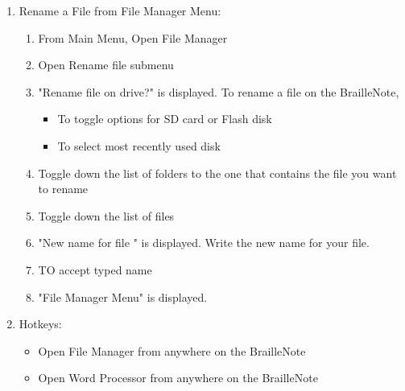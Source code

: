 \documentclass[10pt,letterpaper,twoside]{report}
\begin{document}
{\begin{enumerate}
\begin{enumerate}
		      \item Accept typed information 
		      \item You will be taken back to the Folder Manager Menu.
		      \item Exit Menu
		            \begin{itemize}
			            \item Go back up one menu level 
			            \item Return to Main Menu 
		            \end{itemize}
	      \end{enumerate}
	\item Rename a File from File Manager Menu:
	      \begin{enumerate}
		      \item From Main Menu, Open File Manager 
		      \item Open Rename file submenu 
		      \item "Rename file on drive?" is displayed. To rename a file on the BrailleNote,
		            \begin{itemize}
			            \item To toggle options for SD card or Flash disk 
			            \item To select most recently used disk 
		            \end{itemize}
		      \item Toggle down the list of folders to the one  that contains the file you want to rename 
		      \item Toggle down the list of files 
		      \item "New name for file " is displayed. Write the new name for your file.
		      \item TO accept typed name 
		      \item "File Manager Menu" is displayed.
	      \end{enumerate}
	\item Hotkeys:
	      \begin{itemize}
		      \item Open File Manager from anywhere on the BrailleNote 
		      \item Open Word Processor from anywhere on the BrailleNote 
	      \end{itemize}
\end{enumerate}
\clearpage
}
\end{document}
